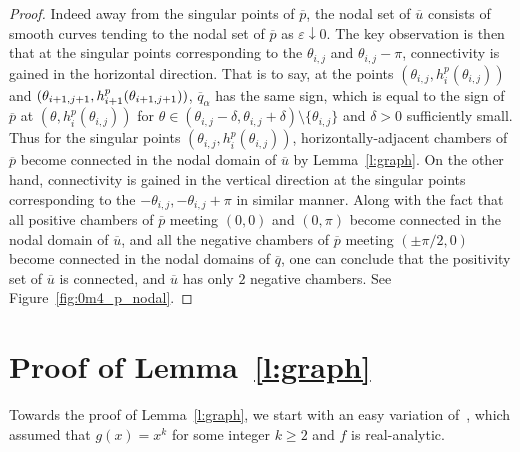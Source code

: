 \documentclass[10pt]{amsart}
\theoremstyle{definition}\newtheorem{defi}[theo]{Definition}\newtheorem{rema}[theo]{Remark}\newtheorem{exam}[theo]{Example}\newtheorem{exem}[theo]{Example}\newtheorem{nota}[theo]{Notation}
\newcommand{\da}{\downarrow}
\newcommand{\ol}{\overline}
\renewcommand{\epsilon}{\varepsilon}
\begin{document}
\begin{proof}
Indeed away from the singular points of $\ol{p}$, the nodal set of $\ol{u}$ consists of smooth curves tending to the nodal set of $\ol{p}$ as $\epsilon \da 0$. The key observation is then that at the singular points corresponding to the $\theta_{i,j}$ and $\theta_{i,j} - \pi$, connectivity is gained in the horizontal direction. That is to say, at the points $(\theta_{i,j}, h_i^p(\theta_{i,j}))$ and $(\theta_{i+1, j+1},\linebreak h_{i+1}^p(\theta_{i+1, j+1}))$, $\ol{q}_\alpha$ has the same sign, which is equal to the sign of $\ol{p}$ at $(\theta, h_i^p(\theta_{i,j})) $ for $\theta \in (\theta_{i,j} - \delta, \theta_{i,j} + \delta) \setminus \{\theta_{i,j}\}$ and $\delta >0 $ sufficiently small. Thus for the singular points $(\theta_{i,j}, h_i^p(\theta_{i,j}))$, horizontally-adjacent chambers of $\ol{p}$ become connected in the nodal domain of $\ol{u}$ by Lemma~\ref{l:graph}. On the other hand, connectivity is gained in the vertical direction at the singular points corresponding to the $-\theta_{i,j}, -\theta_{i,j} + \pi$ in similar manner. Along with the fact that all positive chambers of $\ol{p}$ meeting $(0, 0)$ and $(0, \pi)$ become connected in the nodal domain of $\ol{u}$, and all the negative chambers of $\ol{p}$ meeting $(\pm \pi/2, 0)$ become connected in the nodal domains of $\ol{q}$, one can conclude that the positivity set of $\ol{u}$ is connected, and $\ol{u}$ has only $2$ negative chambers. See Figure~\ref{fig:0m4_p_nodal}.
\end{proof}

\section{Proof of Lemma~\ref{l:graph}} \label{s:appendix}

Towards the proof of Lemma~\ref{l:graph}, we start with an easy variation of~\cite[Lemma~3]{Lewy77}, which assumed that $g(x)=x^k$ for some integer $k\geq 2$ and $f$ is real-analytic.
\end{document}
